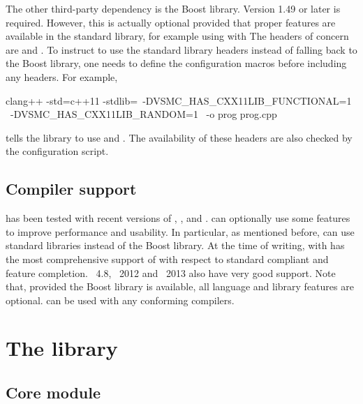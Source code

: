 The other third-party dependency is the Boost library. Version 1.49 or later
is required. However, this is actually optional provided that proper \cppoo
features are available in the standard library, for example using \clang with
\libcpp The \cppoo headers of concern are  and
. To instruct \vsmc to use the standard library headers instead
of falling back to the Boost library, one needs to define the configuration
macros before including any \vsmc headers. For example,
\begin{cppcode}
clang++ -std=c++11 -stdlib=\libcpp     \
    -DVSMC_HAS_CXX11LIB_FUNCTIONAL=1  \
    -DVSMC_HAS_CXX11LIB_RANDOM=1      \
    -o prog prog.cpp
\end{cppcode}
tells the library to use \cppoo{}  and .
The availability of these headers are also checked by the \cmake configuration
script.

\subsection{Compiler support}

\vsmc has been tested with recent versions of \clang, \gcc, \icpc and \msvc.
\vsmc can optionally use some \cppoo features to improve performance and
usability. In particular, as mentioned before, \vsmc can use \cppoo standard
libraries instead of the Boost library. At the time of writing, \clang with
\libcpp has the most comprehensive support of \cppoo with respect to standard
compliant and feature completion. \gcc~4.8, \msvc~2012 and \icpc~2013 also
have very good \cppoo support. Note that, provided the Boost library is
available, all \cppoo language and library features are optional. \vsmc can be
used with any \cppne conforming compilers.

\section{The \protect\vsmc library}
\label{sec:The vSMC library}

\subsection{Core module}
\label{sub:Core module}

